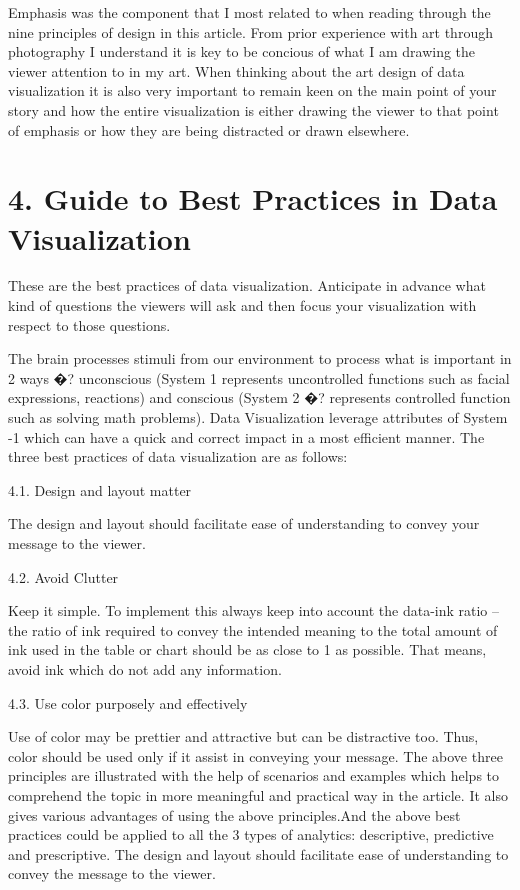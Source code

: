 \documentclass[]{book}
\theoremstyle{definition}
\theoremstyle{definition}
\theoremstyle{definition}
\theoremstyle{remark}
\begin{document}
Emphasis was the component that I most related to when reading through
the nine principles of design in this article. From prior experience
with art through photography I understand it is key to be concious of
what I am drawing the viewer attention to in my art. When thinking about
the art design of data visualization it is also very important to remain
keen on the main point of your story and how the entire visualization is
either drawing the viewer to that point of emphasis or how they are
being distracted or drawn elsewhere.

\section{4. Guide to Best Practices in Data
Visualization}\label{guide-to-best-practices-in-data-visualization}

These are the best practices of data visualization. Anticipate in
advance what kind of questions the viewers will ask and then focus your
visualization with respect to those questions.

The brain processes stimuli from our environment to process what is
important in 2 ways �? unconscious (System 1 represents uncontrolled
functions such as facial expressions, reactions) and conscious (System 2
�? represents controlled function such as solving math problems). Data
Visualization leverage attributes of System -1 which can have a quick
and correct impact in a most efficient manner. The three best practices
of data visualization are as follows:

4.1. Design and layout matter

The design and layout should facilitate ease of understanding to convey
your message to the viewer.

4.2. Avoid Clutter

Keep it simple. To implement this always keep into account the data-ink
ratio -- the ratio of ink required to convey the intended meaning to the
total amount of ink used in the table or chart should be as close to 1
as possible. That means, avoid ink which do not add any information.

4.3. Use color purposely and effectively

Use of color may be prettier and attractive but can be distractive too.
Thus, color should be used only if it assist in conveying your message.
The above three principles are illustrated with the help of scenarios
and examples which helps to comprehend the topic in more meaningful and
practical way in the article. It also gives various advantages of using
the above principles.And the above best practices could be applied to
all the 3 types of analytics: descriptive, predictive and prescriptive.
The design and layout should facilitate ease of understanding to convey
the message to the viewer.
\end{document}
